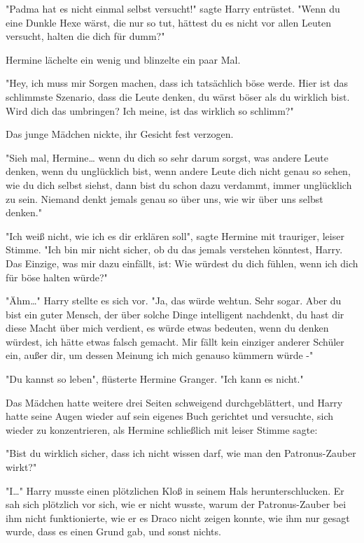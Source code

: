 {"Padma hat es nicht einmal selbst versucht!" sagte Harry entrüstet. "Wenn du eine Dunkle Hexe wärst, die nur so tut, hättest du es nicht vor allen Leuten versucht, halten die dich für dumm?"

Hermine lächelte ein wenig und blinzelte ein paar Mal.

"Hey, ich muss mir Sorgen machen, dass ich tatsächlich böse werde. Hier ist das schlimmste Szenario, dass die Leute denken, du wärst böser als du wirklich bist. Wird dich das umbringen? Ich meine, ist das wirklich so schlimm?"

Das junge Mädchen nickte, ihr Gesicht fest verzogen.

"Sieh mal, Hermine… wenn du dich so sehr darum sorgst, was andere Leute denken, wenn du unglücklich bist, wenn andere Leute dich nicht genau so sehen, wie du dich selbst siehst, dann bist du schon dazu verdammt, immer unglücklich zu sein. Niemand denkt jemals genau so über uns, wie wir über uns selbst denken."

"Ich weiß nicht, wie ich es dir erklären soll", sagte Hermine mit trauriger, leiser Stimme. "Ich bin mir nicht sicher, ob du das jemals verstehen könntest, Harry. Das Einzige, was mir dazu einfällt, ist: Wie würdest du dich fühlen, wenn ich dich für böse halten würde?"

"Ähm…" Harry stellte es sich vor. "Ja, das würde wehtun. Sehr sogar. Aber du bist ein guter Mensch, der über solche Dinge intelligent nachdenkt, du hast dir diese Macht über mich verdient, es würde etwas bedeuten, wenn du denken würdest, ich hätte etwas falsch gemacht. Mir fällt kein einziger anderer Schüler ein, außer dir, um dessen Meinung ich mich genauso kümmern würde -"

"Du kannst so leben", flüsterte Hermine Granger. "Ich kann es nicht."

Das Mädchen hatte weitere drei Seiten schweigend durchgeblättert, und Harry hatte seine Augen wieder auf sein eigenes Buch gerichtet und versuchte, sich wieder zu konzentrieren, als Hermine schließlich mit leiser Stimme sagte:

"Bist du wirklich sicher, dass ich nicht wissen darf, wie man den Patronus-Zauber wirkt?"

"I…" Harry musste einen plötzlichen Kloß in seinem Hals herunterschlucken. Er sah sich plötzlich vor sich, wie er nicht wusste, warum der Patronus-Zauber bei ihm nicht funktionierte, wie er es Draco nicht zeigen konnte, wie ihm nur gesagt wurde, dass es einen Grund gab, und sonst nichts.

}
